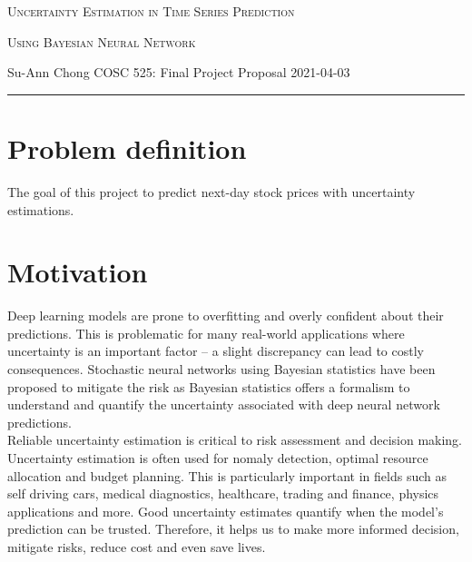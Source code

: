 \documentclass[12pt]{amsart}
\begin{document}
\thispagestyle{empty}

{\hfill {\scshape \large Uncertainty Estimation in Time Series Prediction  \hfill} 

\smallskip

{\hfill {\scshape \large Using Bayesian Neural Network \hfill} 
\smallskip 

{ Su-Ann Chong} \hfill COSC 525: Final Project Proposal \hfill  {\scshape 2021-04-03}

\smallskip

\hrule

\bigskip

\section{Problem definition}

The goal of this project to predict next-day stock prices with uncertainty estimations. 

\bigskip
\section{Motivation}


Deep learning models are prone to overfitting and overly confident about their predictions. This is problematic for many real-world applications where uncertainty is an important factor -- a slight discrepancy can lead to costly consequences. Stochastic neural networks using Bayesian statistics have been proposed to mitigate the risk as Bayesian statistics offers a formalism to understand and quantify the uncertainty associated with deep neural network predictions. \\

Reliable uncertainty estimation is critical to risk assessment and decision making. Uncertainty estimation is often used for nomaly detection, optimal resource allocation and budget planning. This is particularly important in fields such as self driving cars, medical diagnostics, healthcare, trading and finance, physics applications and more. Good uncertainty estimates quantify when the model's prediction can be trusted. Therefore, it helps us to make more informed decision, mitigate risks, reduce cost and even save lives. 

}}
\end{document}
